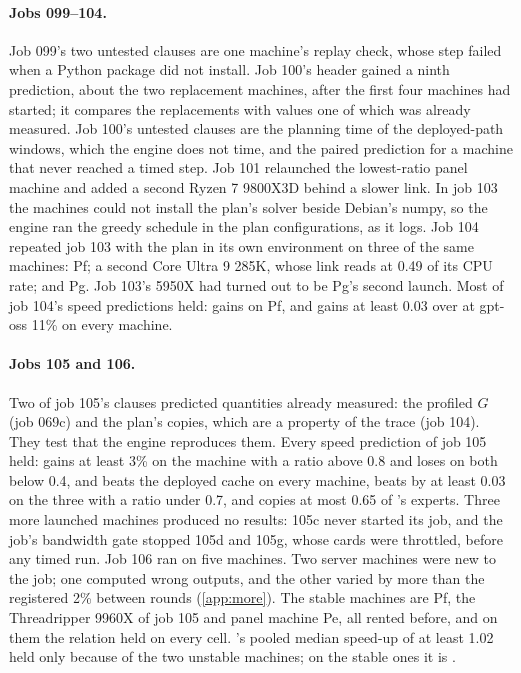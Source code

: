 \paragraph{Jobs 099--104.} Job 099's two untested clauses are one machine's replay check, whose step failed when a
Python package did not install. Job 100's header gained a ninth prediction, about the two replacement machines, after
the first four machines had started; it compares the replacements with values one of which was already measured. Job
100's untested clauses are the planning time of the deployed-path windows, which the engine does not time, and the
paired prediction for a machine that never reached a timed step. Job 101 relaunched the lowest-ratio panel machine and
added a second Ryzen 7 9800X3D behind a slower link. In job 103 the machines could not install the plan's solver
beside Debian's numpy, so the engine ran the greedy schedule in the plan configurations, as it logs. Job 104 repeated
job 103 with the plan in its own environment on three of the same machines: Pf; a second Core Ultra 9 285K, whose link
reads at 0.49 of its CPU rate; and Pg. Job 103's 5950X had turned out to be Pg's second launch. Most of job 104's
speed predictions held: \FewOne{} gains on Pf, and gains at least 0.03 over \MinOne{} at gpt-oss 11\% on every
machine.

\paragraph{Jobs 105 and 106.} Two of job 105's clauses predicted quantities already measured: the profiled $G$ (job
069c) and the plan's copies, which are a property of the trace (job 104). They test that the engine reproduces them.
Every speed prediction of job 105 held: \LA{} gains at least 3\% on the machine with a ratio above 0.8 and loses on
both below 0.4, and \FewOne{} beats the deployed cache on every machine, beats \MinOne{} by at least 0.03 on the three
with a ratio under 0.7, and copies at most 0.65 of \MinOne{}'s experts. Three more launched machines produced no
results: 105c never started its job, and the job's bandwidth gate stopped 105d and 105g, whose cards were throttled,
before any timed run. Job 106 ran on five machines. Two server machines were new to the job; one computed wrong
outputs, and the other varied by more than the registered 2\% between rounds (\cref{app:more}). The \jiStable{} stable
machines are Pf, the Threadripper 9960X of job 105 and panel machine Pe, all rented before, and on them the relation
held on every cell. \Margin{}'s pooled median speed-up of at least 1.02 held only because of the two unstable
machines; on the stable ones it is \jiDkPooled.

